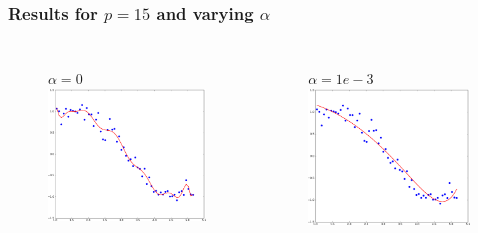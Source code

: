 \documentclass[handout]{beamer}
\begin{document}
\begin{frame}
\frametitle{Results for $p=15$ and varying $\alpha$}
\begin{columns}
\vspace{-2em}
\begin{figure}
$\alpha=0$
\includegraphics[width=0.99\textwidth]{./fig/L1/lasso_alpha0.png}
\end{figure}
\vspace{-2em}
\begin{figure}
$\alpha=1e-3$
\includegraphics[width=0.99\textwidth]{./fig/L1/lasso_alpha1e-3.png}

\end{figure}
\end{columns}
\end{frame}
\end{document}
